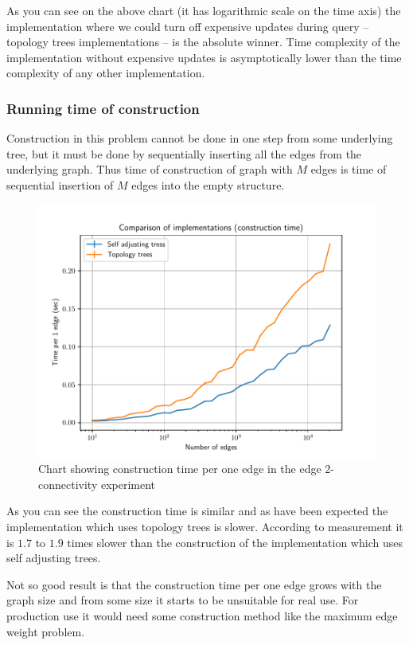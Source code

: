 As you can see on the above chart (it has logarithmic scale on the time axis)
the implementation where we could turn off expensive updates during query --
topology trees implementations -- is the absolute winner. Time complexity of
the implementation without expensive updates is asymptotically lower than the
time complexity of any other implementation.

\subsubsection{Running time of construction}

Construction in this problem cannot be done in one step from some underlying
tree, but it must be done by sequentially inserting all the edges from the
underlying graph. Thus time of construction of graph with $M$ edges is time of
sequential insertion of $M$ edges into the empty structure.

\begin{figure}[H]
\centering
{}\hsize
\includegraphics[width=\hsize]{charts/double_edge_connectivity_construction.pdf}
\caption[Chart of construction time per edge in the edge 2-connectivity experiment]
{Chart showing construction time per one edge in the edge 2-connectivity experiment}
\end{figure}

As you can see the construction time is similar and as have been expected the
implementation which uses topology trees is slower. According to measurement
it is $1.7$ to $1.9$ times slower than the construction of the implementation
which uses self adjusting trees.

Not so good result is that the construction time per one edge grows with the
graph size and from some size it starts to be unsuitable for real use. For
production use it would need some construction method like the maximum edge
weight problem.
